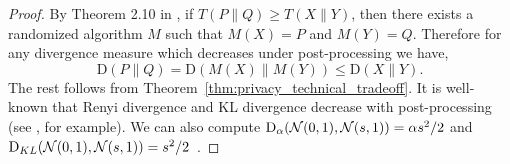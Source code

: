 \begin{proof}

By Theorem 2.10 in \cite{dong2019gaussian}, if $T(P\|Q) \ge T(X\|Y)$, then there exists a randomized algorithm $M$ such that $M(X)=P$ and $M(Y)=Q$. Therefore for any divergence measure which decreases under post-processing we have,
$$\mathrm{D}(P\|Q)= \mathrm{D}(M(X)\|M(Y)) \le \mathrm{D}(X\|Y).$$ The rest follows from Theorem~\ref{thm:privacy_technical_tradeoff}. It is well-known that Renyi divergence and KL divergence decrease with post-processing (see \cite{EH14}, for example). We can also compute $\mathrm{D}_\alpha(\mathcal N(0,1),\mathcal N(s,1))=\alpha s^2/2$ and $\mathrm{D}_{KL}(\mathcal N(0,1),\mathcal N(s,1))=s^2/2$~\cite{Mir17}.
\end{proof}

